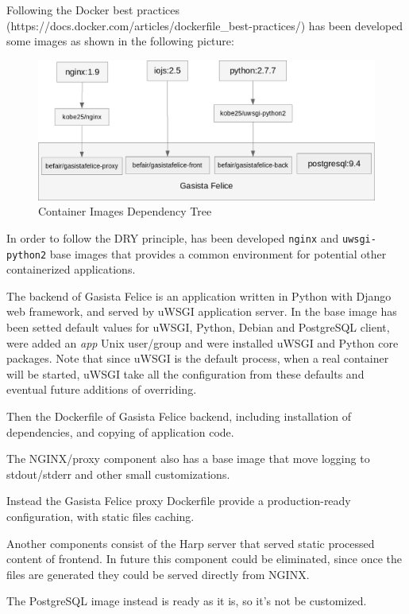 Following the Docker best practices
(https://docs.docker.com/articles/dockerfile\_best-practices/) has been
developed some images as shown in the following picture:

\begin{figure}[htbp]
\centering
\includegraphics{media/ch3-images_tree.png}
\caption{Container Images Dependency Tree}
\end{figure}

In order to follow the DRY principle, has been developed \texttt{nginx}
and \texttt{uwsgi-python2} base images that provides a common
environment for potential other containerized applications.

The backend of Gasista Felice is an application written in Python with
Django web framework, and served by uWSGI application server. In the
base image has been setted default values for uWSGI, Python, Debian and
PostgreSQL client, were added an \textit{app} Unix user/group and were
installed uWSGI and Python core packages. Note that since uWSGI is the
default process, when a real container will be started, uWSGI take all
the configuration from these defaults and eventual future additions of
overriding.

Then the Dockerfile of Gasista Felice backend, including installation of
dependencies, and copying of application code.

The NGINX/proxy component also has a base image that move logging to
stdout/stderr and other small customizations.

Instead the Gasista Felice proxy Dockerfile provide a production-ready
configuration, with static files caching.

Another components consist of the Harp server that served static
processed content of frontend. In future this component could be
eliminated, since once the files are generated they could be served
directly from NGINX.

The PostgreSQL image instead is ready as it is, so it's not be
customized.

